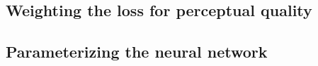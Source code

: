 

\subsection{Weighting the loss for perceptual quality}

\subsection{Parameterizing the neural network} \label{sec:diffusion-architecture}

